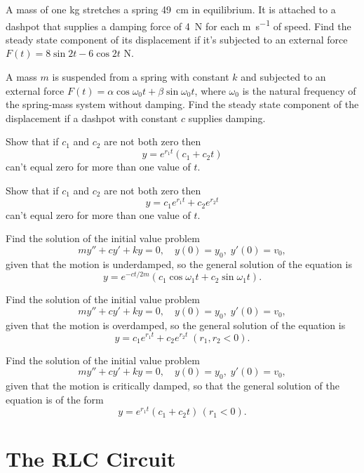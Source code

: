 \begin{exerciselist}
\item\label{exer:6.2.20}A mass of one \unit{\kilo\gram} stretches a spring \qty{49}{\centi\meter} in equilibrium. It is
attached to a dashpot that supplies a damping force of \qty{4}{\newton} for each
\unit{\meter\per\second} of speed. Find the steady state component of its displacement if
it's subjected to an external force $F(t)=8\sin2t-6\cos2t$ \unit{\newton}.


\item\label{exer:6.2.21}A mass $m$ is suspended from a spring with constant $k$ and subjected to an
external force $F(t)=\alpha\cos\omega_0t+\beta\sin\omega_0t$, where
$\omega_0$ is the natural frequency of the spring-mass system without
damping. Find the steady state component of the displacement if a dashpot
with constant $c$ supplies damping.

\item\label{exer:6.2.22}Show that if $c_1$ and $c_2$ are not both zero then
\[
y=e^{r_1t}(c_1+c_2t)
\]
can't equal zero for more than one value of
$t$.

\item\label{exer:6.2.23}Show that if $c_1$ and $c_2$ are not both zero then
\[
y=c_1e^{r_1t}+c_2e^{r_2t}
\]
 can't equal zero for more than one
value of $t$.

\item\label{exer:6.2.24}Find the solution of the initial value problem
\[
my''+cy'+ky=0,\quad y(0)=y_0,\;y'(0)=v_0,
\]
given that the motion is underdamped, so  the general solution of
the equation is
\[
y=e^{-ct/2m}(c_1\cos\omega_1t+c_2\sin\omega_1t).
\]

\item\label{exer:6.2.25}Find the solution of the initial value problem
\[
my''+cy'+ky=0,\quad y(0)=y_0,\;y'(0)=v_0,
\]
given that the motion is overdamped, so  the general solution of
the equation is
\[
y=c_1e^{r_1t}+c_2e^{r_2t}\;(r_1,r_2<0).
\]

\item\label{exer:6.2.26}Find the solution of the initial value problem
\[
my''+cy'+ky=0,\quad y(0)=y_0,\;y'(0)=v_0,
\]
given that the motion is critically damped, so that the general
solution of the equation is of the form
\[
y=e^{r_1t}(c_1+c_2t)\,(r_1<0).
\]
\end{exerciselist}


\section{The RLC Circuit}\label{sec:rlc}

